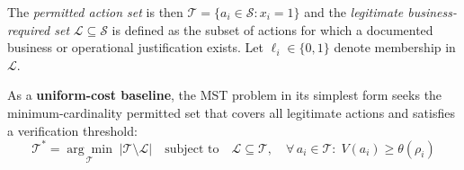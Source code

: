 \documentclass[acmlarge]{acmart}
\begin{document}
The \textit{permitted action set} is then $\mathcal{T} = \{a_i \in \mathcal{S} : x_i = 1\}$
and the \textit{legitimate business-required set} $\mathcal{L} \subseteq \mathcal{S}$
is defined as the subset of actions for which a documented business or operational
justification exists. Let $\ell_i \in \{0,1\}$ denote membership in $\mathcal{L}$.

As a \textbf{uniform-cost baseline}, the MST problem in its simplest form seeks the
minimum-cardinality permitted set that covers all legitimate actions and satisfies a
verification threshold:
\begin{equation}
\mathcal{T}^{*} = \underset{\mathcal{T}}{\arg\min}\;
\bigl|\mathcal{T} \setminus \mathcal{L}\bigr|
\quad \text{subject to} \quad
\mathcal{L} \subseteq \mathcal{T},
\quad \forall\, a_i \in \mathcal{T}:\; V(a_i) \geq \theta(\rho_i)
\label{eq:mvt}
\end{equation}
\end{document}
